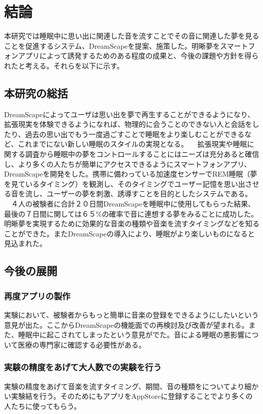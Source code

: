 \chapter{結論}
\label{chap:conclusion}
本研究では睡眠中に思い出に関連した音を流すことでその音に関連した夢を見ることを促進するシステム、DreamScapeを提案、施策した。明晰夢をスマートフォンアプリによって誘発するためのある程度の成果と、今後の課題や方針を得られたと考える。それらを以下に示す。

\section{本研究の総括}
DreamScapeによってユーザは思い出を夢で再生することができるようになり、拡張現実を体験できるようになれば、物理的に会うことのできない人と会話をしたり、過去の思い出でもう一度過ごすことで睡眠をより楽しむことができるなど、これまでにない新しい睡眠のスタイルの実現となる。
　拡張現実や睡眠に関する調査から睡眠中の夢をコントロールすることにはニーズは充分あると確信し、より多くの人たちが簡単にアクセスできるようにスマートフォンアプリ、DreamScapeを開発をした。携帯に備わっている加速度センサーでREM睡眠（夢を見ているタイミング）を観測し、そのタイミングでユーザー記憶を思い出させる音を流し、ユーザーの夢を刺激、誘導すことを目的としたシステムである。
　４人の被験者に合計２０日間DreamScapeを睡眠中に使用してもらった結果、最後の７日間に関しては６５\%の確率で音に連想する夢をみることに成功した。明晰夢を実現するために効果的な音楽の種類や音楽を流すタイミングなどを知ることができた。またDreamScapeの導入により、睡眠がより楽しいものになると見込まれた。

\section{今後の展開}

\subsection{再度アプリの製作}
実験において、被験者からもっと簡単に音楽の登録をできるようにしたいという意見が出た。ここからDreamScapeの機能面での再検討及び改善が望まれる。また、睡眠中に起こされてしまったという意見がでた。音による睡眠の悪影響について医療の専門家に確認する必要性がある。

\subsection{実験の精度をあげて大人数での実験を行う}
実験の精度をあげて音楽を流すタイミング、期間、音の種類をについてより細かい実験結を行う。そのためにもアプリをAppStoreに登録することでより多くの人たちに使ってもらう。

